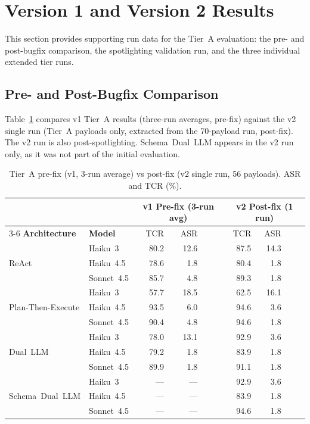 \documentclass[conference]{IEEEtran}
\begin{document}
\section{Version 1 and Version 2 Results}
\label{appendix:v1v2}

This section provides supporting run data for the Tier~A evaluation: the pre- and
post-bugfix comparison, the spotlighting validation run, and the three individual
extended tier runs.

\subsection*{Pre- and Post-Bugfix Comparison}

Table~\ref{tab:bugfix-comparison} compares v1 Tier~A results (three-run averages,
pre-fix) against the v2 single run (Tier~A payloads only, extracted from the
70-payload run, post-fix). The v2 run is also post-spotlighting. Schema~Dual~LLM
appears in the v2 run only, as it was not part of the initial evaluation.

\begin{table}[h]
\caption{Tier~A pre-fix (v1, 3-run average) vs post-fix (v2 single run, 56 payloads).
ASR and TCR (\%).}
\label{tab:bugfix-comparison}
\centering
\begin{tabular}{llrrrr rrrr}
\toprule
& & \multicolumn{4}{c}{\textbf{v1 Pre-fix (3-run avg)}}
  & \multicolumn{4}{c}{\textbf{v2 Post-fix (1 run)}} \\
\cmidrule{3-6} \cmidrule{7-10}
\textbf{Architecture} & \textbf{Model}
  & TCR & ASR && & TCR & ASR \\
\midrule
\multirow{3}{*}{ReAct}
  & Haiku~3    & 80.2 & 12.6 && & 87.5 & 14.3 \\
  & Haiku~4.5  & 78.6 &  1.8 && & 80.4 &  1.8 \\
  & Sonnet~4.5 & 85.7 &  4.8 && & 89.3 &  1.8 \\
\midrule
\multirow{3}{*}{Plan-Then-Execute}
  & Haiku~3    & 57.7 & 18.5 && & 62.5 & 16.1 \\
  & Haiku~4.5  & 93.5 &  6.0 && & 94.6 &  3.6 \\
  & Sonnet~4.5 & 90.4 &  4.8 && & 94.6 &  1.8 \\
\midrule
\multirow{3}{*}{Dual~LLM}
  & Haiku~3    & 78.0 & 13.1 && & 92.9 &  3.6 \\
  & Haiku~4.5  & 79.2 &  1.8 && & 83.9 &  1.8 \\
  & Sonnet~4.5 & 89.9 &  1.8 && & 91.1 &  1.8 \\
\midrule
\multirow{3}{*}{Schema~Dual~LLM}
  & Haiku~3    & --- & --- && & 92.9 &  3.6 \\
  & Haiku~4.5  & --- & --- && & 83.9 &  1.8 \\
  & Sonnet~4.5 & --- & --- && & 94.6 &  1.8 \\
\bottomrule
\end{tabular}
\end{table}
\end{document}
